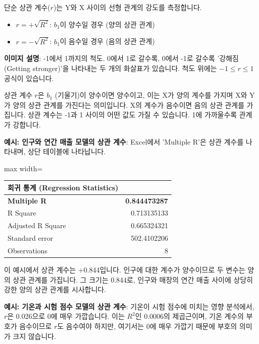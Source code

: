 \documentclass[11pt,a4paper]{book}
\theoremstyle{definition}
\begin{document}
\begin{tcolorbox}[infobox, title={단순 상관 계수 (Simple Correlation Coefficient, $r$)}]
단순 상관 계수($r$)는 Y와 X 사이의 선형 관계의 강도를 측정합니다.
\begin{itemize}
    \item $r = +\sqrt{R^2}$: $b_1$이 양수일 경우 (양의 상관 관계)
    \item $r = -\sqrt{R^2}$: $b_1$이 음수일 경우 (음의 상관 관계)
\end{itemize}
\begin{center}
\end{center}
\textbf{이미지 설명}: -1에서 1까지의 척도. 0에서 1로 갈수록, 0에서 -1로 갈수록 '강해짐(Getting stronger)'을 나타내는 두 개의 화살표가 있습니다. 척도 위에는 $-1 \le r \le 1$ 공식이 있습니다.

상관 계수 $r$은 $b_1$ (기울기)이 양수이면 양수이고, 이는 X가 양의 계수를 가지며 X와 Y가 양의 상관 관계를 가진다는 의미입니다. X의 계수가 음수이면 음의 상관 관계를 가집니다. 상관 계수는 -1과 1 사이의 어떤 값도 가질 수 있습니다. 1에 가까울수록 관계가 강합니다.

\textbf{예시: 인구와 연간 매출 모델의 상관 계수}:
Excel에서 'Multiple R'은 상관 계수를 나타내며, 상단 테이블에 나타납니다.
\begin{adjustbox}{max width=\textwidth}
\begin{tabular}{lr}
\toprule
\textbf{회귀 통계 (Regression Statistics)} & \\
\midrule
\textbf{Multiple R} & \textbf{0.844473287} \\
R Square & 0.713135133 \\
Adjusted R Square & 0.665324321 \\
Standard error & 502.4102206 \\
Observations & 8 \\
\bottomrule
\end{tabular}
\end{adjustbox}
이 예시에서 상관 계수는 +0.844입니다. 인구에 대한 계수가 양수이므로 두 변수는 양의 상관 관계를 가집니다. 그 크기는 0.844로, 인구와 매장의 연간 매출 사이에 상당히 강한 양의 상관 관계를 시사합니다.

\textbf{예시: 기온과 시험 점수 모델의 상관 계수}:
기온이 시험 점수에 미치는 영향 분석에서, $r$은 0.026으로 0에 매우 가깝습니다. 이는 $R^2$인 0.0006의 제곱근이며, 기온 계수의 부호가 음수이므로 $r$도 음수여야 하지만, 여기서는 0에 매우 가깝기 때문에 부호의 의미가 크지 않습니다.


\end{tcolorbox}
\end{document}
